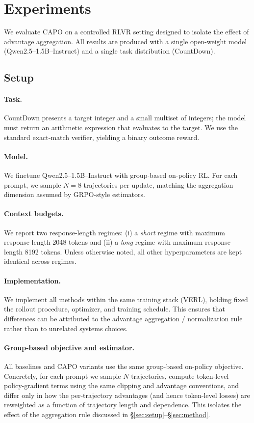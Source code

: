 \section{Experiments}
\label{sec:results}

We evaluate CAPO on a controlled RLVR setting designed to isolate the effect of
advantage aggregation. All results are produced with a single open-weight model
(Qwen2.5--1.5B--Instruct) and a single task distribution (CountDown).

\subsection{Setup}
\paragraph{Task.} CountDown presents a target integer and a small multiset of
integers; the model must return an arithmetic expression that evaluates to the
target. We use the standard exact-match verifier, yielding a binary outcome
reward.

\paragraph{Model.} We finetune Qwen2.5--1.5B--Instruct with group-based
on-policy RL. For each prompt, we sample $N=8$ trajectories per update, matching
the aggregation dimension assumed by GRPO-style estimators.

\paragraph{Context budgets.} We report two response-length regimes:
(i) a \emph{short} regime with maximum response length 2048 tokens and
(ii) a \emph{long} regime with maximum response length 8192 tokens. Unless
otherwise noted, all other hyperparameters are kept identical across regimes.

\paragraph{Implementation.} We implement all methods within the same training
stack (VERL), holding fixed the rollout procedure, optimizer, and training
schedule. This ensures that differences can be attributed to the advantage
aggregation / normalization rule rather than to unrelated systems choices.

\paragraph{Group-based objective and estimator.}
All baselines and CAPO variants use the same group-based on-policy objective.
Concretely, for each prompt we sample $N$ trajectories, compute token-level policy-gradient terms using the same clipping and advantage conventions, and differ only in how the per-trajectory advantages (and hence token-level losses) are reweighted as a function of trajectory length and dependence.
This isolates the effect of the aggregation rule discussed in \S\ref{sec:setup}--\S\ref{sec:method}.

